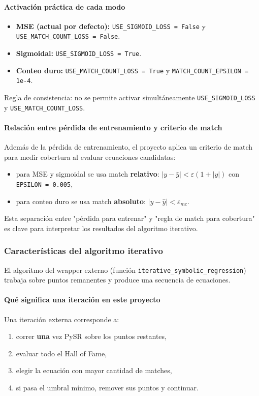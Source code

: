 \documentclass[12pt]{article}
\begin{document}
\paragraph{Activación práctica de cada modo}
\begin{itemize}[leftmargin=1.5em]
    \item \textbf{MSE (actual por defecto):}
    \texttt{USE\_SIGMOID\_LOSS = False} y
    \texttt{USE\_MATCH\_COUNT\_LOSS = False}.
    \item \textbf{Sigmoidal:}
    \texttt{USE\_SIGMOID\_LOSS = True}.
    \item \textbf{Conteo duro:}
    \texttt{USE\_MATCH\_COUNT\_LOSS = True} y
    \texttt{MATCH\_COUNT\_EPSILON = 1e-4}.
\end{itemize}

Regla de consistencia: no se permite activar simultáneamente \texttt{USE\_SIGMOID\_LOSS} y \texttt{USE\_MATCH\_COUNT\_LOSS}.

\paragraph{Relación entre pérdida de entrenamiento y criterio de match}
Además de la pérdida de entrenamiento, el proyecto aplica un criterio de match para medir cobertura al evaluar ecuaciones candidatas:
\begin{itemize}[leftmargin=1.5em]
    \item para MSE y sigmoidal se usa match \textbf{relativo}:
    $|y-\hat y| < \varepsilon(1+|y|)$ con \texttt{EPSILON = 0.005},
    \item para conteo duro se usa match \textbf{absoluto}:
    $|y-\hat y| < \varepsilon_{mc}$.
\end{itemize}

Esta separación entre "pérdida para entrenar" y "regla de match para cobertura" es clave para interpretar los resultados del algoritmo iterativo.

\subsubsection*{Características del algoritmo iterativo}
El algoritmo del wrapper externo (función \texttt{iterative\_symbolic\_regression}) trabaja sobre puntos remanentes y produce una secuencia de ecuaciones.

\paragraph{Qué significa una iteración en este proyecto}
Una iteración externa corresponde a:
\begin{enumerate}[leftmargin=1.5em]
    \item correr \textbf{una} vez PySR sobre los puntos restantes,
    \item evaluar todo el Hall of Fame,
    \item elegir la ecuación con mayor cantidad de matches,
    \item si pasa el umbral mínimo, remover sus puntos y continuar.
\end{enumerate}
\end{document}
